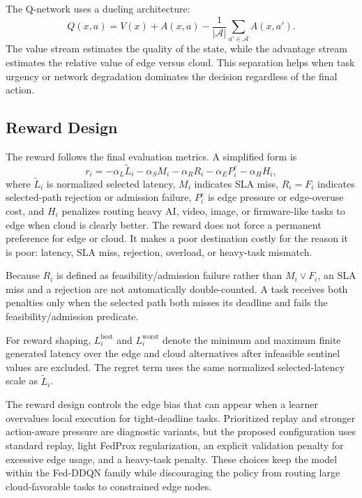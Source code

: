 The Q-network uses a dueling architecture:
\begin{equation}
Q(x,a)=V(x)+A(x,a)-\frac{1}{|\mathcal{A}|}\sum_{a'\in\mathcal{A}}A(x,a').
\label{eq:dueling_main}
\end{equation}
The value stream estimates the quality of the state, while the advantage stream estimates the relative value of edge versus cloud. This separation helps when task urgency or network degradation dominates the decision regardless of the final action.

\subsection{Reward Design}

The reward follows the final evaluation metrics. A simplified form is
\begin{equation}
r_i = -\alpha_L \tilde{L}_i - \alpha_S M_i - \alpha_R R_i
      - \alpha_E P^e_i - \alpha_H H_i,
\label{eq:reward}
\end{equation}
where $\tilde{L}_i$ is normalized selected latency, $M_i$ indicates SLA miss, $R_i=F_i$ indicates selected-path rejection or admission failure, $P_i^e$ is edge pressure or edge-overuse cost, and $H_i$ penalizes routing heavy AI, video, image, or firmware-like tasks to edge when cloud is clearly better. The reward does not force a permanent preference for edge or cloud. It makes a poor destination costly for the reason it is poor: latency, SLA miss, rejection, overload, or heavy-task mismatch.

Because $R_i$ is defined as feasibility/admission failure rather than $M_i\lor F_i$, an SLA miss and a rejection are not automatically double-counted. A task receives both penalties only when the selected path both misses its deadline and fails the feasibility/admission predicate.

For reward shaping, $L_i^{\mathrm{best}}$ and $L_i^{\mathrm{worst}}$ denote the minimum and maximum finite generated latency over the edge and cloud alternatives after infeasible sentinel values are excluded. The regret term uses the same normalized selected-latency scale as $\tilde{L}_i$.




The reward design controls the edge bias that can appear when a learner overvalues local execution for tight-deadline tasks. Prioritized replay \cite{ref37} and stronger action-aware pressure are diagnostic variants, but the proposed configuration uses standard replay, light FedProx regularization, an explicit validation penalty for excessive edge usage, and a heavy-task penalty. These choices keep the model within the Fed-DDQN family while discouraging the policy from routing large cloud-favorable tasks to constrained edge nodes.

